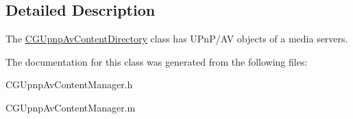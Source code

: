 \subsection{Detailed Description}
The \hyperlink{interface_c_g_upnp_av_content_directory}{C\-G\-Upnp\-Av\-Content\-Directory} class has U\-Pn\-P/\-A\-V objects of a media servers. 

The documentation for this class was generated from the following files\-:\begin{DoxyCompactItemize}
\item 
C\-G\-Upnp\-Av\-Content\-Manager.\-h\item 
C\-G\-Upnp\-Av\-Content\-Manager.\-m\end{DoxyCompactItemize}
